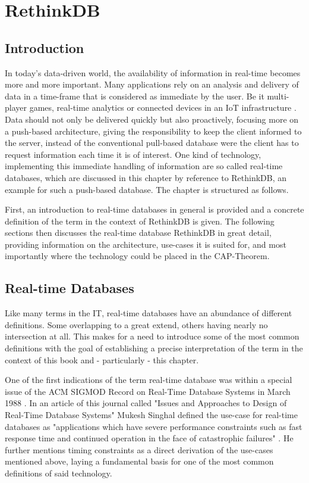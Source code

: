 \section{RethinkDB}

\subsection{Introduction}
In today's data-driven world, the availability of information in real-time becomes more and more important. Many applications rely on an analysis and delivery of data in a time-frame that is considered as immediate by the user. Be it multi-player games, real-time analytics or connected devices in an IoT infrastructure \autocite{Wingerath2017}. Data should not only be delivered quickly but also proactively, focusing more on a push-based architecture, giving the responsibility to keep the client informed to the server, instead of the conventional pull-based database were the client has to request information each time it is of interest.  One kind of technology, implementing this immediate handling of information are so called real-time databases, which are discussed in this chapter by reference to RethinkDB, an example for such a push-based database.
The chapter is structured as follows.


First, an introduction to real-time databases in general is provided and a concrete definition of the term in the context of RethinkDB is given. The following sections then discusses the real-time database RethinkDB in great detail, providing information on the architecture, use-cases it is suited for, and most importantly where the technology could be placed in the CAP-Theorem.

\subsection{Real-time Databases}
\label{sec:rethink_real-time}
Like many terms in the IT, real-time databases have an abundance of different definitions. Some overlapping to a great extend, others having nearly no intersection at all. This makes for a need to introduce some of the most common definitions with the goal of establishing a precise interpretation of the term in the context of this book and - particularly - this chapter.


One of the first indications of the term real-time database was within a special issue of the ACM SIGMOD Record on Real-Time Database Systems in March 1988 \autocite{Eich:1988:44203}. In an article of this journal called "Issues and Approaches to Design of Real-Time Database Systems" Mukesh Singhal defined the use-case for real-time databases as "applications which have severe performance constraints such as fast response time and continued operation in the face of catastrophic failures" \autocite[p.  1]{Singhal:1988:IAD:44203.44205}. He further mentions timing constraints as a direct derivation of the use-cases mentioned above, laying a fundamental basis for one of the most common definitions of said technology.


